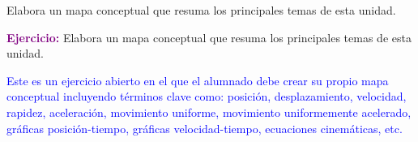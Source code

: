 \begin{exercise}
    Elabora un mapa conceptual que resuma los principales temas de esta unidad.
    \begin{solu}
        \textbf{\textcolor{purple}{Ejercicio:}} Elabora un mapa conceptual que resuma los principales temas de esta unidad.

        \textcolor{blue}{Este es un ejercicio abierto en el que el alumnado debe crear su propio mapa conceptual incluyendo términos clave como: posición, desplazamiento, velocidad, rapidez, aceleración, movimiento uniforme, movimiento uniformemente acelerado, gráficas posición-tiempo, gráficas velocidad-tiempo, ecuaciones cinemáticas, etc.}
    \end{solu}
\end{exercise}

%
%
%
%
